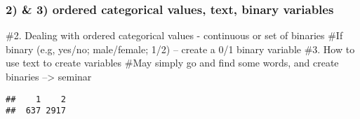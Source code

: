 \documentclass[
]{article}
\newenvironment{Shaded}{\begin{snugshade}}{\end{snugshade}}
\newcommand{\AttributeTok}[1]{\textcolor[rgb]{0.77,0.63,0.00}{#1}}
\newcommand{\CommentTok}[1]{\textcolor[rgb]{0.56,0.35,0.01}{\textit{#1}}}
\newcommand{\FunctionTok}[1]{\textcolor[rgb]{0.00,0.00,0.00}{#1}}
\newcommand{\NormalTok}[1]{#1}
\newcommand{\OtherTok}[1]{\textcolor[rgb]{0.56,0.35,0.01}{#1}}
\newcommand{\SpecialCharTok}[1]{\textcolor[rgb]{0.00,0.00,0.00}{#1}}
\newcommand{\StringTok}[1]{\textcolor[rgb]{0.31,0.60,0.02}{#1}}
\begin{document}
\begin{Shaded}
\end{Shaded}

\hypertarget{ordered-categorical-values-text-binary-variables}{%
\subsubsection{2) \& 3) ordered categorical values, text, binary
variables}\label{ordered-categorical-values-text-binary-variables}}

\#2. Dealing with ordered categorical values - continuous or set of
binaries \#If binary (e.g, yes/no; male/female; 1/2) -- create a 0/1
binary variable \#3. How to use text to create variables \#May simply go
and find some words, and create binaries --\textgreater{} seminar

\begin{Shaded}
\end{Shaded}

\begin{verbatim}
##    1    2 
##  637 2917
\end{verbatim}
\end{document}

